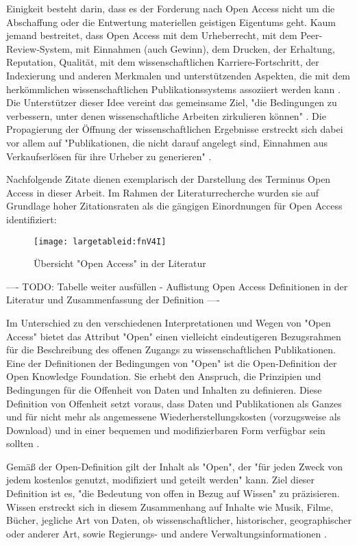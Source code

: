 Einigkeit besteht darin, dass es der Forderung nach Open Access nicht um die Abschaffung oder die Entwertung materiellen geistigen Eigentums geht. Kaum jemand bestreitet, dass Open Access mit dem Urheberrecht, mit dem Peer-Review-System, mit Einnahmen (auch Gewinn), dem Drucken, der Erhaltung, Reputation, Qualität, mit dem wissenschaftlichen Karriere-Fortschritt, der Indexierung und anderen Merkmalen und unterstützenden Aspekten, die mit dem herkömmlichen wissenschaftlichen Publikationssystems assoziiert werden kann \cite{suber_2015}. Die Unterstützer dieser Idee vereint das gemeinsame Ziel, "die Bedingungen zu verbessern, unter denen wissenschaftliche Arbeiten zirkulieren können" \cite{Adema_2014_open_access}. Die Propagierung der Öffnung der wissenschaftlichen Ergebnisse erstreckt sich dabei vor allem auf "Publikationen, die nicht darauf angelegt sind, Einnahmen aus Verkaufserlösen für ihre Urheber zu generieren" \cite{muller_2010_open}.

Nachfolgende Zitate dienen exemplarisch der Darstellung des Terminus Open Access in dieser Arbeit. Im Rahmen der Literaturrecherche wurden sie auf Grundlage hoher Zitationsraten als die gängigen Einordnungen für Open Access identifiziert:
\begin{figure}[h!]
\texttt{[image: largetableid:fnV4I]}
\caption{Übersicht "Open Access" in der Literatur}
\end{figure}

---- TODO: Tabelle weiter ausfüllen - Auflistung Open Access Definitionen in der Literatur und Zusammenfassung der Definition ----

Im Unterschied zu den verschiedenen Interpretationen und Wegen von "Open Access" bietet das Attribut "Open" einen vielleicht eindeutigeren Bezugsrahmen für die Beschreibung des offenen Zugangs zu wissenschaftlichen Publikationen. Eine der Definitionen der Bedingungen von "Open" ist die Open-Definition der Open Knowledge Foundation. Sie erhebt den Anspruch, die Prinzipien und Bedingungen für die Offenheit von Daten und Inhalten zu definieren. Diese Definition von Offenheit setzt voraus, dass Daten und Publikationen als Ganzes und für nicht mehr als angemessene Wiederherstellungskosten (vorzugsweise als Download) und in einer bequemen und modifizierbaren Form verfügbar sein sollten \cite{Molloy_2011}.

Gemäß der Open-Definition gilt der Inhalt als "Open", der "für jeden Zweck von jedem kostenlos genutzt, modifiziert und geteilt werden" \cite{open_definition} kann. Ziel dieser Definition ist es, "die Bedeutung von offen in Bezug auf Wissen" zu präzisieren. Wissen erstreckt sich in diesem Zusammenhang auf Inhalte wie Musik, Filme, Bücher, jegliche Art von Daten, ob wissenschaftlicher, historischer, geographischer oder anderer Art, sowie Regierungs- und andere Verwaltungsinformationen \cite{open_definition}.


